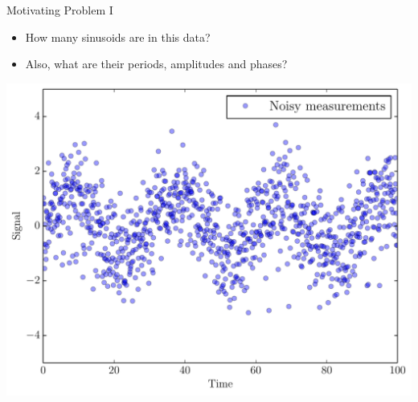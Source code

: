 
\begin{frame}[t,plain]
\titlepage
\end{frame}

\begin{frame}[t]{Motivating Problem I}
\begin{itemize}
\item How many sinusoids are in this data?
\item Also, what are their periods, amplitudes and phases?
\end{itemize}
\begin{center}
\includegraphics[scale=0.35]{sinewave_data.pdf}
\end{center}
\end{frame}

